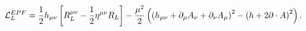 \begin{equation}
{\cal L}_L^{EPF} = \frac{1}{2}h_{\mu\nu} \left[ R^{\mu\nu}_L -
\frac{1}{2} \eta^{\mu\nu} R_L\right] - \frac{\mu^2}{2}\left(\left(h_{\mu\nu} +
\partial_\mu A_\nu + \partial_\nu A_\mu          \right)^2 - \left(h +
2 \partial \cdot A\right)^2\right).
\label{64}
\end{equation}


